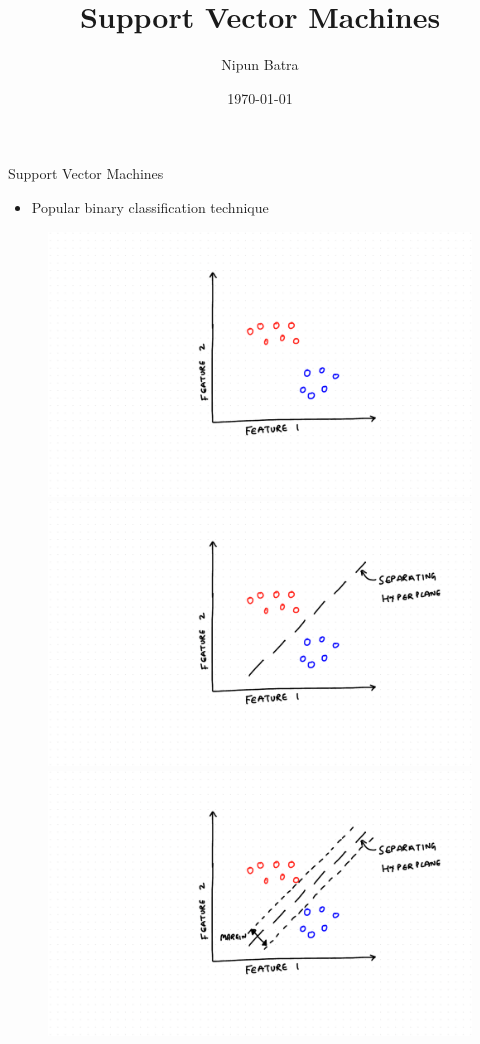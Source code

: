 \documentclass{beamer}
\title{Support Vector Machines}
\date{\today}
\author{Nipun Batra}
\institute{IIT Gandhinagar}
\begin{document}
\maketitle


\begin{frame}{Support Vector Machines}
\begin{itemize}
	\item Popular binary classification technique
\end{itemize}

\begin{figure}
\centering
\begin{overprint}
    \includegraphics[scale = 0.3]{SVM/Svm-1.pdf}
    \includegraphics[scale = 0.3]{SVM/Svm-2.pdf}
    \includegraphics[scale = 0.3]{SVM/Svm-3.pdf}

\end{overprint}
\end{figure}
\end{frame}
\end{document}

